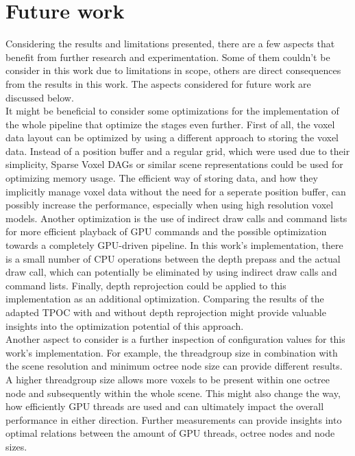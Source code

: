 \chapter{Future work} \label{cpt-future-work}

Considering the results and limitations presented, there are a few aspects that benefit from further 
research and experimentation. Some of them couldn't be consider in this work due to limitations in 
scope, others are direct consequences from the results in this work. The aspects considered for 
future work are discussed below. \\

\noindent
It might be beneficial to consider some optimizations for the implementation of the whole pipeline that 
optimize the stages even further. First of all, the voxel data layout can be optimized by using a different
approach to storing the voxel data. Instead of a position buffer and a regular grid, which were used due to 
their simplicity, Sparse Voxel \ac{DAG}s or similar scene representations could be used for optimizing 
memory usage. The efficient way of storing data, and how they implicitly manage voxel data without the 
need for a seperate position buffer, can possibly increase the performance, especially when using high 
resolution voxel models. Another optimization is the use of indirect draw calls and command lists for 
more efficient playback of \ac{GPU} commands and the possible optimization towards a completely 
\ac{GPU}-driven pipeline. In this work's implementation, there is a small number of \ac{CPU} operations 
between the depth prepass and the actual draw call, which can potentially be eliminated by using indirect 
draw calls and command lists. Finally, depth reprojection could be applied to this implementation as an 
additional optimization. Comparing the results of the adapted \ac{TPOC} with and without depth reprojection 
might provide valuable insights into the optimization potential of this approach. \\

\noindent
Another aspect to consider is a further inspection of configuration values for this work's implementation. 
For example, the threadgroup size in combination with the scene resolution and minimum octree node size 
can provide different results. A higher threadgroup size allows more voxels to be present within one octree 
node and subsequently within the whole scene. This might also change the way, how efficiently \ac{GPU} 
threads are used and can ultimately impact the overall performance in either direction. Further measurements 
can provide insights into optimal relations between the amount of \ac{GPU} threads, octree nodes and node 
sizes. \\

